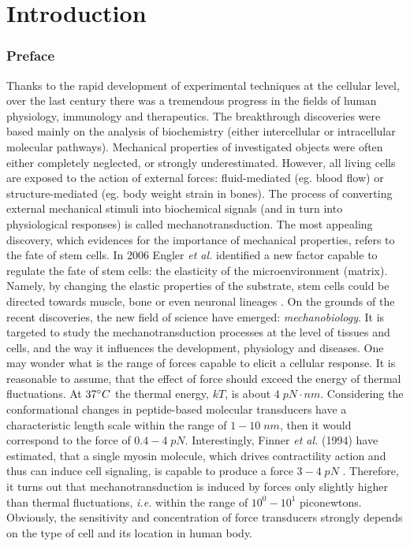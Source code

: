 \part{Introduction}
\section{Preface}
Thanks to the rapid development of experimental techniques at the cellular level, over the last century there was a tremendous progress in the fields of human physiology, immunology and therapeutics. The breakthrough discoveries were based mainly on the analysis of biochemistry (either intercellular or intracellular molecular pathways).
Mechanical properties of investigated objects were often either completely neglected, or strongly underestimated. However, all living cells are exposed to the action of external forces: fluid-mediated (eg. blood flow) or structure-mediated (eg. body weight strain in bones). The process of converting external mechanical stimuli into biochemical signals (and in turn into physiological responses) is called mechanotransduction. 
\newline 
The most appealing discovery, which evidences for the importance of mechanical properties, refers to the fate of stem cells. In 2006 Engler \emph{et al.} identified a new factor capable to regulate the fate of stem cells: the elasticity of the microenvironment (matrix). Namely, by changing the elastic properties of the substrate, stem cells could be directed towards muscle, bone or even neuronal lineages \cite{Even-Ram2006}. On the grounds of the recent discoveries, the new field of science have emerged: \emph{mechanobiology}. It is targeted to study the mechanotransduction processes at the level of tissues and cells, and the way it influences the development, physiology and diseases.
One may wonder what is the range of forces capable to elicit a cellular response. It is reasonable to assume, that the effect of force should exceed the energy of thermal fluctuations. At $37^\circ C$ the thermal energy, $kT$, is about $4\;pN\cdot nm$. Considering the conformational changes in peptide-based molecular transducers have a characteristic length scale within the range of $1 - 10\;nm$, then it would correspond to the force of $0.4-4\;pN$. Interestingly, Finner \emph{et al.} (1994) have estimated, that a single myosin molecule, which drives contractility action and thus can induce cell signaling, is capable to produce a force $3-4\;pN$ \cite{Silberberg2008}. Therefore, it turns out that mechanotransduction is induced by forces only slightly higher than thermal fluctuations, \emph{i.e.} within the range of $10^0-10^1$ piconewtons. Obviously, the sensitivity and concentration of force transducers strongly depends on the type of cell and its location in human body.
\newline

